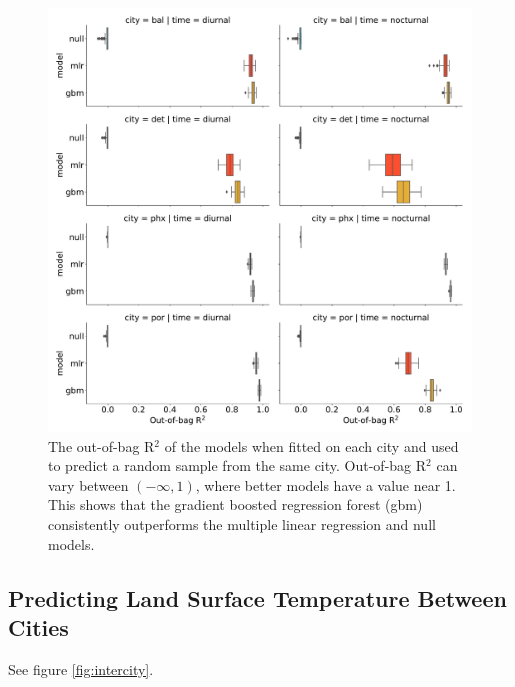 \documentclass[]{elsarticle}
\begin{document}
\begin{figure}[h]
\begin{center}
\includegraphics[width=\textwidth]{fig/report/holdout_results_r2.pdf}
\caption{The out-of-bag R$^2$ of the models when fitted on each city and used to predict a random sample from the same city. Out-of-bag R$^2$ can vary between $(-\infty, 1)$, where better models have a value near 1. This shows that the gradient boosted regression forest (gbm) consistently outperforms the multiple linear regression and null models.}
\label{fig:intracity}
\end{center}
\end{figure}


\subsection{Predicting Land Surface Temperature Between Cities}

See figure \ref{fig:intercity}.
\end{document}
